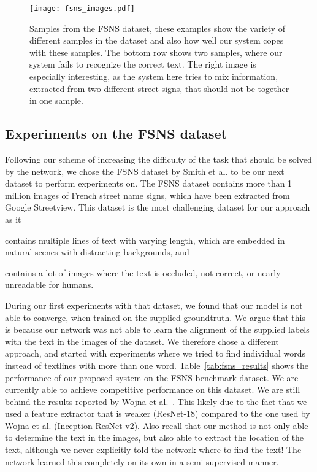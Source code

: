 \documentclass[letterpaper]{article}
\begin{document}
	\begin{figure*}[ht!]
		\centering
		\texttt{[image: fsns\_images.pdf]}
		\caption{Samples from the \ac{FSNS} dataset, these examples show the variety of different samples in the dataset and also how well our system copes with these samples. The bottom row shows two samples, where our system fails to recognize the correct text. The right image is especially interesting, as the system here tries to mix information, extracted from two different street signs, that should not be together in one sample.}
		\label{fig:fsns_examples}
	\end{figure*}

	\subsection{Experiments on the \ac{FSNS} dataset}
	\label{ssec:fsns_experiments}

	Following our scheme of increasing the difficulty of the task that should be solved by the network, we chose the \acf{FSNS} dataset by Smith et al. \cite{Smith2016EndToEnd} to be our next dataset to perform experiments on.
	The \ac{FSNS} dataset contains more than 1 million images of French street name signs, which have been extracted from Google Streetview.
	This dataset is the most challenging dataset for our approach as it
	\begin{enumerate*}[label={(\arabic*)}]
		\item contains multiple lines of text with varying length, which are embedded in natural scenes with distracting backgrounds, and
		\item contains a lot of images where the text is occluded, not correct, or nearly unreadable for humans.
	\end{enumerate*}

	During our first experiments with that dataset, we found that our model is not able to converge, when trained on the supplied groundtruth.
	We argue that this is because our network was not able to learn the alignment of the supplied labels with the text in the images of the dataset.
	We therefore chose a different approach, and started with experiments where we tried to find individual words instead of textlines with more than one word.
	Table~\ref{tab:fsns_results} shows the performance of our proposed system on the \ac{FSNS} benchmark dataset. We are currently able to achieve competitive performance on this dataset. We are still behind the results reported by Wojna et al.~\cite{Wojna2017AttentionBased}. This likely due to the fact that we used a feature extractor that is weaker (ResNet-18) compared to the one used by Wojna et al. (Inception-ResNet v2). Also recall that our method is not only able to determine the text in the images, but also able to extract the location of the text, although we never explicitly told the network where to find the text! The network learned this completely on its own in a semi-supervised manner.
\end{document}
